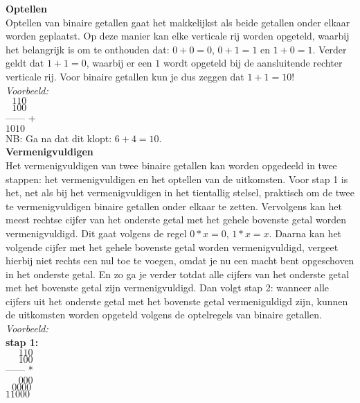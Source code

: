 \documentclass[10pt,a4paper,titlepage]{article}
\newcommand{\1}{\'{e}\'{e}n}
\begin{document}
\begin{enumerate}
\textbf{Optellen}\\
Optellen van binaire getallen gaat het makkelijkst als beide getallen onder elkaar worden geplaatst. Op deze manier kan elke verticale rij worden opgeteld, waarbij het belangrijk is om te onthouden dat: $0+0=0$, $0+1=1$ en $1+0=1$. Verder geldt dat $1+1=0$, waarbij er een $1$ wordt opgeteld bij de aansluitende rechter verticale rij. Voor binaire getallen kun je dus zeggen dat $1+1=10$!\\

\textit{Voorbeeld:}\\
$ \textrm{    }110$\\
$ \textrm{    }100$\\
------ +\\
$1010$\\

NB: Ga na dat dit klopt: $6+4=10$. \\

\textbf{Vermenigvuldigen}\\
Het vermenigvuldigen van twee binaire getallen kan worden opgedeeld in twee stappen: het vermenigvuldigen en het optellen van de uitkomsten. Voor stap 1 is het, net als bij het vermenigvuldigen in het tientallig stelsel, praktisch om de twee te vermenigvuldigen binaire getallen onder elkaar te zetten. Vervolgens kan het meest rechtse cijfer van het onderste getal met het gehele bovenste getal worden vermenigvuldigd. Dit gaat volgens de regel $0*x=0$, $1*x=x$. Daarna kan het volgende cijfer met het gehele bovenste getal worden vermenigvuldigd, vergeet hierbij niet rechts een nul toe te voegen, omdat je nu een macht bent opgeschoven in het onderste getal. En zo ga je verder totdat alle cijfers van het onderste getal met het bovenste getal zijn vermenigvuldigd. Dan volgt stap 2: wanneer alle cijfers uit het onderste getal met het bovenste getal vermeniguldigd zijn, kunnen de uitkomsten worden opgeteld volgens de optelregels van binaire getallen.\\

\textit{Voorbeeld:}\\
\textbf{stap 1:}\\
$\textrm{ }\textrm{ }110$\\
$\textrm{ }\textrm{ }100$\\
------ *\\
$\textrm{ }\textrm{ }000$\\
$\textrm{    }0000$\\
$ 11000$\\


\end{enumerate}
\end{document}
